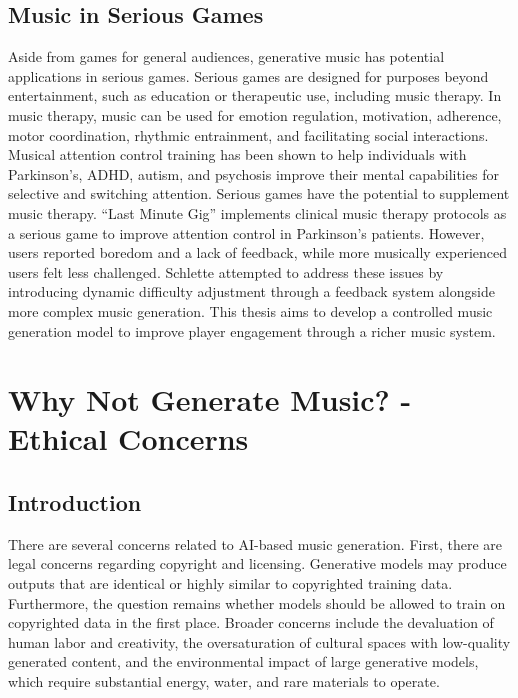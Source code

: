 \subsection{Music in Serious Games}
Aside from games for general audiences, generative music has potential applications in serious games. Serious games are designed for purposes beyond entertainment, such as education or therapeutic use, including music therapy\cite{Djaouti2011}. In music therapy, music can be used for emotion regulation, motivation, adherence, motor coordination, rhythmic entrainment, and facilitating social interactions\cite{musicwellbeing_agres_2021}. Musical attention control training has been shown to help individuals with Parkinson’s\cite{Park_Kim_2021}, ADHD\cite{Martin-Moratinos_Bella-Fernández_Blasco-Fontecilla_2023}, autism\cite{Pasiali_LaGasse_Penn_2014}, and psychosis\cite{van_Alphen_Stams_Hakvoort_2019} improve their mental capabilities for selective and switching attention. Serious games have the potential to supplement music therapy. “Last Minute Gig”\cite{Chalkiadakis_2022} implements clinical music therapy protocols as a serious game to improve attention control in Parkinson’s patients. However, users reported boredom and a lack of feedback, while more musically experienced users felt less challenged. Schlette\cite{Schlette_2022} attempted to address these issues by introducing dynamic difficulty adjustment through a feedback system alongside more complex music generation. This thesis aims to develop a controlled music generation model to improve player engagement through a richer music system.

\section{Why Not Generate Music? - Ethical Concerns} \label{ethical}
\subsection{Introduction}
There are several concerns related to AI-based music generation. First, there are legal concerns regarding copyright and licensing. Generative models may produce outputs that are identical or highly similar to copyrighted training data. Furthermore, the question remains whether models should be allowed to train on copyrighted data in the first place. Broader concerns include the devaluation of human labor and creativity, the oversaturation of cultural spaces with low-quality generated content, and the environmental impact of large generative models, which require substantial energy, water, and rare materials to operate.


